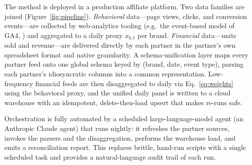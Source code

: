 \documentclass[11pt]{article}
\begin{document}
The method is deployed in a production affiliate platform. Two data families are
joined (Figure~\ref{fig:pipeline}). \emph{Behavioral} data---page views,
clicks, and conversion events---are collected by web-analytics tooling (e.g.\
the event-based model of GA4, \citealp{GA4Docs2023}) and aggregated to a daily
proxy $x_{b,t}$ per brand. \emph{Financial} data---units sold and revenue---are
delivered directly by each partner in the partner's own spreadsheet format and
native granularity. A schema-unification layer \citep{Lenzerini2002} maps every
partner feed onto one global schema keyed by (brand, date, event type), parsing
each partner's idiosyncratic columns into a common representation. Low-frequency
financial feeds are then disaggregated to daily via Eq.~\eqref{eq:weights} using
the behavioral proxy, and the unified daily panel is written to a cloud
warehouse with an idempotent, delete-then-load upsert that makes re-runs safe.

Orchestration is fully automated by a scheduled large-language-model agent
(an Anthropic Claude agent) that runs nightly: it refreshes the partner sources,
invokes the parsers and the disaggregation, performs the warehouse load, and
emits a reconciliation report. This replaces brittle, hand-run scripts with a
single scheduled task and provides a natural-language audit trail of each run.
\end{document}

